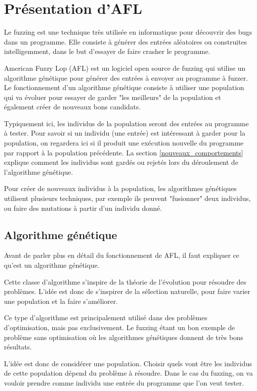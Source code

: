\chapter{Présentation d'AFL}

Le fuzzing est une technique très utilisée en informatique pour découvrir
des bugs dans un programme. Elle consiste à générer des entrées aléatoires
ou construites intelligemment, dans le but d'essayer de faire crasher le
programme.

American Fuzzy Lop (AFL) est un logiciel open source de fuzzing qui utilise
un algorithme génétique pour générer des entrées à envoyer au programme à
fuzzer. Le fonctionnement d'un algorithme génétique consiste à utiliser
une population qui va évoluer pour essayer de garder "les meilleurs" de la
population et également créer de nouveaux bons candidats.

Typiquement ici, les individus de la population seront des entrées au
programme à tester. Pour savoir si un individu (une entrée) est intéressant
à garder pour la population, on regardera ici si il produit une
exécution nouvelle du programme par rapport à la population précédente. La
section \ref{nouveaux_comportements} explique comment les individus sont
gardés ou rejetés lors du déroulement de l'algorithme génétique.

Pour créer de nouveaux individus à la population, les algorithmes
génétiques utilisent plusieurs techniques, par exemple ils peuvent
"fusionner" deux individus, ou faire des mutations à partir d'un individu
donné.

\section{Algorithme génétique}\label{genetique}

Avant de parler plus en détail du fonctionnement de AFL, il faut expliquer
ce qu'est un algorithme génétique.

Cette classe d'algorithme s'inspire de la théorie de l'évolution pour
résoudre des problèmes. L'idée est donc de s'inspirer de la sélection
naturelle, pour faire varier une population et la faire s'améliorer.

Ce type d'algorithme est principalement utilisé dans des problèmes
d'optimisation, mais pas exclusivement. Le fuzzing étant un bon exemple
de problème sans optimisation où les algorithmes génétiques donnent de
très bons résultats.

L'idée est donc de considérer une population. Choisir quels vont être les
individus de cette population dépend du problème à résoudre. Dans le cas du
fuzzing, on va vouloir prendre comme individu une entrée du programme que
l'on veut tester.

